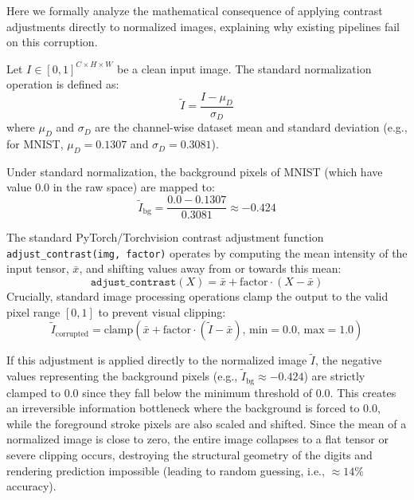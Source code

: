 \documentclass{article}
\theoremstyle{plain}
\theoremstyle{definition}
\theoremstyle{remark}
\begin{document}
Here we formally analyze the mathematical consequence of applying contrast adjustments directly to normalized images, explaining why existing pipelines fail on this corruption.

Let $I \in [0, 1]^{C \times H \times W}$ be a clean input image. The standard normalization operation is defined as:
\begin{equation}
    \tilde{I} = \frac{I - \mu_D}{\sigma_D}
\end{equation}
where $\mu_D$ and $\sigma_D$ are the channel-wise dataset mean and standard deviation (e.g., for MNIST, $\mu_D = 0.1307$ and $\sigma_D = 0.3081$).

Under standard normalization, the background pixels of MNIST (which have value 0.0 in the raw space) are mapped to:
\begin{equation}
    \tilde{I}_{\text{bg}} = \frac{0.0 - 0.1307}{0.3081} \approx -0.424
\end{equation}

The standard PyTorch/Torchvision contrast adjustment function \texttt{adjust\_contrast(img, factor)} operates by computing the mean intensity of the input tensor, $\bar{x}$, and shifting values away from or towards this mean:
\begin{equation}
    \texttt{adjust\_contrast}(X) = \bar{x} + \text{factor} \cdot (X - \bar{x})
\end{equation}
Crucially, standard image processing operations clamp the output to the valid pixel range $[0, 1]$ to prevent visual clipping:
\begin{equation}
    \tilde{I}_{\text{corrupted}} = \text{clamp}(\bar{x} + \text{factor} \cdot (\tilde{I} - \bar{x}), \, \text{min}=0.0, \, \text{max}=1.0)
\end{equation}

If this adjustment is applied directly to the normalized image $\tilde{I}$, the negative values representing the background pixels (e.g., $\tilde{I}_{\text{bg}} \approx -0.424$) are strictly clamped to $0.0$ since they fall below the minimum threshold of $0.0$.
This creates an irreversible information bottleneck where the background is forced to 0.0, while the foreground stroke pixels are also scaled and shifted. Since the mean of a normalized image is close to zero, the entire image collapses to a flat tensor or severe clipping occurs, destroying the structural geometry of the digits and rendering prediction impossible (leading to random guessing, i.e., $\approx 14\%$ accuracy).
\end{document}
